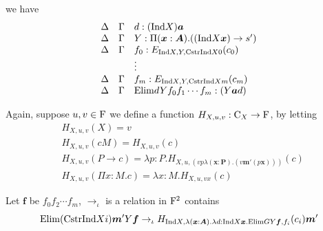 we have
\[
  \begin{array}{lll}
    \Delta   &\Gamma   & d: (\mathrm{Ind} X) \boldsymbol{a}  \\
    \Delta   &\Gamma   & Y : \Pi (\boldsymbol{x}: \boldsymbol{A}) . ((\mathrm{Ind} X \boldsymbol{x}) \to s') \\
    \Delta   &\Gamma   & f_0 : E_{\mathrm{Ind} X, Y, \mathrm{Cstr} \mathrm{Ind} X 0}(c_0) \\
             &         & \vdots \\
    \Delta   &\Gamma   & f_m : E_{\mathrm{Ind} X, Y, \mathrm{Cstr} \mathrm{Ind} X m}(c_m) \\
    \Delta   &\Gamma   & \mathrm{Elim} d Y f_0 f_1 \cdots f_m : (Y \boldsymbol{a} d)
  \end{array}
\]







Again, suppose $u, v \in \mathrm{F}$ we define a function $H_{X, u, v}: \mathrm{C}_X \to \mathrm{F}$, by letting
\begin{align*}
  & H_{X, u ,v} (X) = v \\
  & H_{X, u ,v} (c M) = H_{X, u ,v} (c) \\
  & H_{X, u ,v} (P \to c) = \lambda p: P . H_{X, u ,(v p \lambda (\bm x : \bm P). (v \bm m' (p \bm x)))}(c) \\
  & H_{X, u ,v} (\Pi x : M. c) = \lambda x : M . H_{X, u ,v x} (c)
\end{align*}




\begin{definition}
  Let $\bm f$ be $f_0f_2\cdots f_m$, $\rightarrow_{\iota}$ is a relation in $\mathrm{F}^2$ contains
  \[
  \mathrm{Elim} (\mathrm{Cstr} \mathrm{Ind} X i) \boldsymbol{m}' Y \boldsymbol{f} \rightarrow_{\iota} H_{\mathrm{Ind} X, \lambda(\boldsymbol{x} : \boldsymbol{A}). \lambda d : \mathrm{Ind} X \boldsymbol{x} . \mathrm{Elim} G Y \boldsymbol{f} , f_i } (c_i)\boldsymbol{m}'
  \]
\end{definition}

